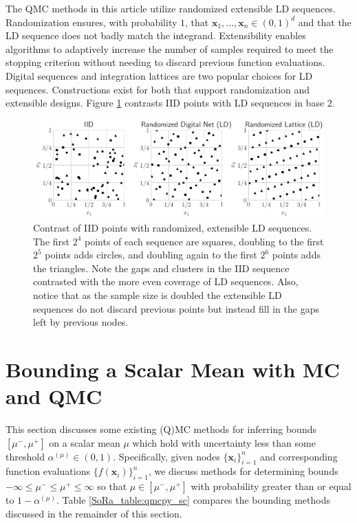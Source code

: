 \documentclass[graybox]{svmult}
\begin{document}
The QMC methods in this article utilize randomized extensible LD sequences. Randomization ensures, with probability $1$, that $\boldsymbol{x}_1,\dots,\boldsymbol{x}_n \in (0,1)^d$ and that the LD sequence does not badly match the integrand. Extensibility enables algorithms to adaptively increase the number of samples required to meet the stopping criterion without needing to discard previous function evaluations. Digital sequences and integration lattices are two popular choices for LD sequences. Constructions exist for both that support randomization and extensible designs. Figure \ref{SoRa_fig:ld_seqs} contrasts IID points with LD sequences in base $2$.

\begin{figure}[t]
    \centering
    \includegraphics[width=\textwidth]{figs/ld_seqs.pdf}
    \caption{Contrast of IID points with randomized, extensible LD sequences. The first $2^4$ points of each sequence are squares, doubling to the first $2^5$ points adds circles, and doubling again to the first $2^6$ points adds the triangles. Note the gaps and clusters in the IID sequence contrasted with the more even coverage of LD sequences. Also, notice that as the sample size is doubled the extensible LD sequences do not discard previous points but instead fill in the gaps left by previous nodes.}
    \label{SoRa_fig:ld_seqs}
\end{figure}

\section{Bounding a Scalar Mean with MC and QMC}\label{SoRa_sec:Existing_QMC_Methods}

This section discusses some existing (Q)MC methods for inferring bounds $[\mu^-,\mu^+]$ on a scalar mean $\mu$ which hold with uncertainty less than some threshold $\alpha^{(\mu)} \in (0,1)$. Specifically, given nodes $\{\boldsymbol{x}_i\}_{i=1}^n$ and corresponding function evaluations $\{f(\boldsymbol{x}_i)\}_{i=1}^n$, we discuss methods for determining bounds $-\infty \leq \mu^- \leq \mu^+ \leq \infty$ so that $\mu \in [\mu^-,\mu^+]$ with probability greater than or equal to $1-\alpha^{(\mu)}$. Table \ref{SoRa_table:qmcpy_sc} compares the bounding methods discussed in the remainder of this section.
\end{document}
